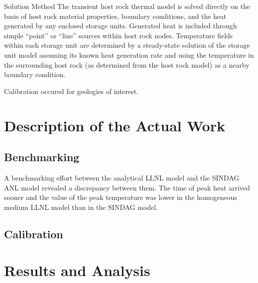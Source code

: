 \documentclass{anstrans}
\begin{document}
Solution Method
The transient host rock thermal model is solved directly on the basis of host 
rock material properties, boundary conditions, and the heat generated by any 
enclosed storage units. Generated heat is included through simple “point” or 
“line” sources within host rock nodes.  Temperature fields within each storage 
unit are determined by a steady-state solution of the storage unit model 
assuming its known heat generation rate and using the temperature in the 
surrounding host rock (as determined from the host rock model) as a nearby 
boundary condition. 

Calibration occured for geologies of interest.  




\section{Description of the Actual Work}

\subsection{Benchmarking}

A benchmarking effort between the analytical \gls{LLNL} model and the 
\gls{SINDAG} \gls{ANL} model revealed a discrepancy between them. The time of 
peak heat arrived sooner and the value of the peak temperature was lower in the 
homogeneous medium \gls{LLNL} model than in the \gls{SINDAG} model. 





\subsection{Calibration}

\section{Results and Analysis}


\end{document}
